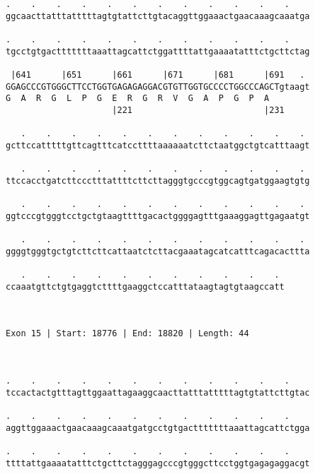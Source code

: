 \documentclass{article}
\begin{document}
\begin{Verbatim}
.    .    .    .    .    .    .    .    .    .    .    .    
ggcaacttatttatttttagtgtattcttgtacaggttggaaactgaacaaagcaaatga
                                                            
.    .    .    .    .    .    .    .    .    .    .    .    
tgcctgtgactttttttaaattagcattctggattttattgaaaatatttctgcttctag
                                                            
 |641      |651      |661      |671      |681      |691   . 
GGAGCCCGTGGGCTTCCTGGTGAGAGAGGACGTGTTGGTGCCCCTGGCCCAGCTgtaagt
G  A  R  G  L  P  G  E  R  G  R  V  G  A  P  G  P  A        
                     |221                          |231     
  
   .    .    .    .    .    .    .    .    .    .    .    . 
gcttccatttttgttcagtttcatccttttaaaaaatcttctaatggctgtcatttaagt
                                                            
   .    .    .    .    .    .    .    .    .    .    .    . 
ttccacctgatcttccctttattttcttcttagggtgcccgtggcagtgatggaagtgtg
                                                            
   .    .    .    .    .    .    .    .    .    .    .    . 
ggtcccgtgggtcctgctgtaagttttgacactggggagtttgaaaggagttgagaatgt
                                                            
   .    .    .    .    .    .    .    .    .    .    .    . 
ggggtgggtgctgtcttcttcattaatctcttacgaaatagcatcatttcagacacttta
                                                            
   .    .    .    .    .    .    .    .    .    .    . 
ccaaatgttctgtgaggtcttttgaaggctccatttataagtagtgtaagccatt
                                                       
                                                       
 
Exon 15 | Start: 18776 | End: 18820 | Length: 44



.    .    .    .    .    .    .    .    .    .    .    .    
tccactactgtttagttggaattagaaggcaacttatttatttttagtgtattcttgtac
                                                            
.    .    .    .    .    .    .    .    .    .    .    .    
aggttggaaactgaacaaagcaaatgatgcctgtgactttttttaaattagcattctgga
                                                            
.    .    .    .    .    .    .    .    .    .    .    .    
ttttattgaaaatatttctgcttctagggagcccgtgggcttcctggtgagagaggacgt
                                                            

\end{Verbatim}
\end{document}
